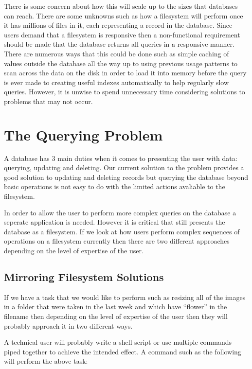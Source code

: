 There is some concern about how this will scale up to the sizes that databases can reach. There are some unknowns such as how a filesystem will perform once it has millions of files in it, each representing a record in the database. Since users demand that a filesystem is responsive then a non-functional requirement should be made that the database returns all queries in a responsive manner. There are numerous ways that this could be done such as simple caching of values outside the database all the way up to using previous usage patterns to scan across the data on the disk in order to load it into memory before the query is ever made to creating useful indexes automatically to help regularly slow queries. However, it is unwise to spend unnecessary time considering solutions to problems that may not occur.

\section{The Querying Problem}

A database has 3 main duties when it comes to presenting the user with data: querying, updating and deleting. Our current solution to the problem provides a good solution to updating and deleting records but querying the database beyond basic operations is not easy to do with the limited actions avaliable to the filesystem.

In order to allow the user to perform more complex queries on the database a seperate application is needed. However it is critical that still presents the database as a filesystem. If we look at how users perform complex sequences of operations on a filesystem currently then there are two different approaches depending on the level of expertise of the user.

\subsection{Mirroring Filesystem Solutions}

If we have a task that we would like to perform such as resizing all of the images in a folder that were taken in the last week and which have ``flower'' in the filename then depending on the level of expertise of the user then they will probably approach it in two different ways.

A technical user will probably write a shell script or use multiple commands piped together to achieve the intended effect. A command such as the following will perform the above task:

